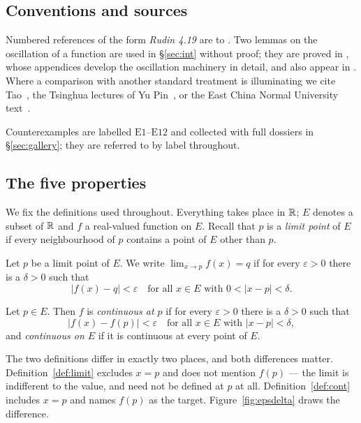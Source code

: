 \subsection*{Conventions and sources}

Numbered references of the form \emph{Rudin 4.19} are to
\cite{rudin}. Two lemmas on the oscillation of a function are used in
\S\ref{sec:int} without proof; they are proved in
\cite{annotated}, whose appendices develop the oscillation machinery in
detail, and also appear in \cite{yupin}. Where a comparison with another
standard treatment is illuminating we cite Tao~\cite{taoI,taoII}, the
Tsinghua lectures of Yu Pin~\cite{yupin}, or the East China Normal
University text~\cite{ecnu}.

Counterexamples are labelled $\mathrm{E}1$--$\mathrm{E}12$ and collected with
full dossiers in \S\ref{sec:gallery}; they are referred to by label
throughout.

\subsection{The five properties}
\label{sec:defs}

We fix the definitions used throughout. Everything takes place in $\mathbb{R}$; $E$
denotes a subset of $\mathbb{R}$ and $f$ a real-valued function on $E$. Recall that
$p$ is a \emph{limit point} of $E$ if every neighbourhood of $p$ contains a
point of $E$ other than $p$.

\begin{definition}[Limit]\label{def:limit}
Let $p$ be a limit point of $E$. We write $\lim_{x\to p} f(x) = q$ if for
every $\varepsilon>0$ there is a $\delta>0$ such that
\[ |f(x)-q| < \varepsilon \quad\text{for all } x \in E
   \text{ with } 0 < |x-p| < \delta . \]
\end{definition}

\begin{definition}[Continuity]\label{def:cont}
Let $p \in E$. Then $f$ is \emph{continuous at $p$} if for every
$\varepsilon>0$ there is a $\delta>0$ such that
\[ |f(x)-f(p)| < \varepsilon \quad\text{for all } x \in E
   \text{ with } |x-p| < \delta , \]
and \emph{continuous on $E$} if it is continuous at every point of $E$.
\end{definition}

The two definitions differ in exactly two places, and both differences
matter. Definition~\ref{def:limit} excludes $x=p$ and does not mention
$f(p)$ --- the limit is indifferent to the value, and need not be defined at
$p$ at all. Definition~\ref{def:cont} includes $x=p$ and names $f(p)$ as the
target. Figure~\ref{fig:epsdelta} draws the difference.

